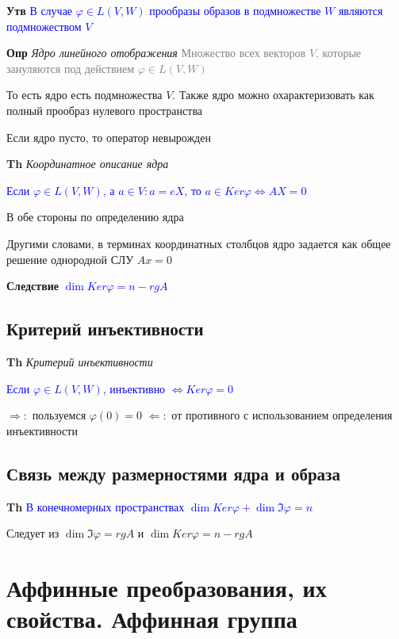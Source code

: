 \documentclass[a4paper, 14pt]{article}
\begin{document}
    \textbf{Утв} \textcolor{blue}{В случае $\varphi \in L(V, W)$ прообразы образов в подмножестве $W$ являются
    подмножеством $V$}

    \textbf{Опр} \textit{Ядро линейного отображения} \textcolor{gray}{Множество всех векторов $V$, которые зануляются
    под действием $\varphi \in L(V, W)$}

    То есть ядро есть подмножества $V$.
    Также ядро можно охарактеризовать как полный прообраз нулевого пространства

    Если ядро пусто, то оператор невырожден

    \textbf{Th} \textit{Координатное описание ядра}

    \textcolor{blue}{Если $\varphi \in L(V, W)$, а $a \in V: a = eX$, то $a \in Ker \varphi \Leftrightarrow AX = 0$}

    В обе стороны по определению ядра

    Другими словами, в терминах координатных столбцов ядро задается как общее решение однородной СЛУ $Ax = 0$

    \textbf{Следствие} \textcolor{blue}{$\dim Ker \varphi = n - rg A$}

    \subsection{Критерий инъективности}

    \textbf{Th} \textit{Критерий инъективности}

    \textcolor{blue}{Если $\varphi \in L(V, W)$, инъективно
        $\Leftrightarrow Ker \varphi = 0$}

    $\Rightarrow:$ пользуемся $\varphi(0) = 0$
    $\Leftarrow:$ от противного с использованием определения инъективности

    \subsection{Связь между размерностями ядра и образа}

    \textbf{Th} \textcolor{blue}{В конечномерных пространствах $\dim Ker \varphi + \dim \Im \varphi = n$}

    Следует из $\dim \Im \varphi = rg A$ и $\dim Ker \varphi = n - rg A$

    \section{Аффинные преобразования, их свойства.
    Аффинная группа}
\end{document}
